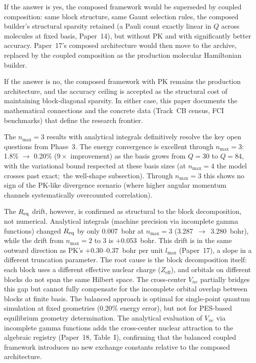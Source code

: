 \documentclass[aps,pra,twocolumn,superscriptaddress,longbibliography]{revtex4-2}
\begin{document}
If the answer is yes, the composed framework would be superseded by
coupled composition: same block structure, same Gaunt selection
rules, the composed builder's structural sparsity retained (a Pauli
count exactly linear in $Q$ across molecules at fixed basis,
Paper~14), but without PK and with significantly better accuracy.  Paper~17's composed architecture
would then move to the archive, replaced by the coupled composition
as the production molecular Hamiltonian builder.

If the answer is no, the composed framework with PK remains the
production architecture, and the accuracy ceiling is accepted as the
structural cost of maintaining block-diagonal sparsity.  In either
case, this paper documents the mathematical connections and the
concrete data (Track~CB census, FCI benchmarks) that define the
research frontier.

The $n_{\max} = 3$ results with analytical integrals definitively
resolve the key open questions from Phase~3.  The energy convergence
is excellent through $n_{\max}=3$: 1.8\% $\to$ 0.20\% ($9\times$ improvement) as the
basis grows from $Q = 30$ to $Q = 84$, with the variational bound
respected at these basis sizes (at $n_{\max}=4$ the model crosses past
exact;\ the well-shape subsection).  Through $n_{\max}=3$ this shows no sign of the PK-like divergence scenario (where
higher angular momentum channels systematically overcounted
correlation).

The $R_{\rm eq}$ drift, however, is confirmed as structural to the
block decomposition, not numerical.  Analytical integrals (machine
precision via incomplete gamma functions) changed $R_{\rm eq}$ by
only 0.007~bohr at $n_{\max} = 3$ (3.287~$\to$~3.280~bohr), while
the drift from $n_{\max} = 2$ to 3 is $+0.053$~bohr.  This drift
is in the same outward direction as PK's $+0.30$--$0.37$~bohr per unit
$l_{\max}$ (Paper~17), a slope in a different truncation parameter.  The root cause is the block
decomposition itself: each block uses a different effective nuclear
charge ($Z_{\mathrm{eff}}$), and orbitals on different blocks do not
span the same Hilbert space.  The cross-center $V_{ne}$ partially
bridges this gap but cannot fully compensate for the incomplete
orbital overlap between blocks at finite basis.  The balanced
approach is optimal for single-point quantum simulation at fixed
geometries (0.20\% energy error), but not for PES-based equilibrium
geometry determination.  The analytical evaluation of $V_{ne}$ via
incomplete gamma functions adds the cross-center nuclear attraction
to the algebraic registry (Paper~18, Table~I), confirming that the
balanced coupled framework introduces no new exchange constants
relative to the composed architecture.
\end{document}
